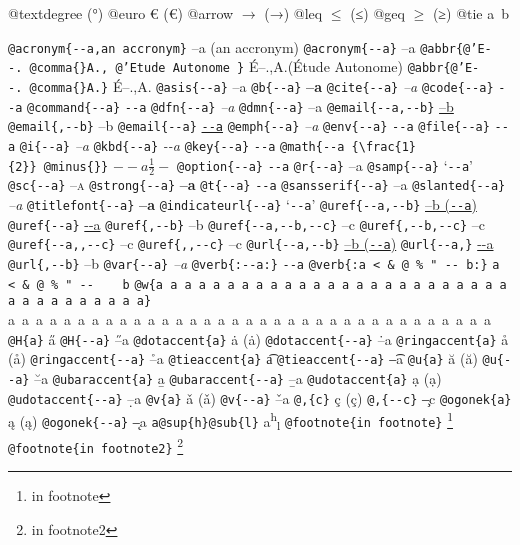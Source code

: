 \documentclass{book}
\newcommand\Texinfocommandstyletextcite[1]{{\normalfont{}\textsl{#1}}}%
\newcommand\Texinfocommandstyletextkbd[1]{{\ttfamily\textsl{#1}}}%
\newcommand\Texinfocommandstyletextvar[1]{{\normalfont{}\textsl{#1}}}%
\renewcommand{\_}{\Texinfounderscore\discretionary{}{}{}}
\begin{document}
\begin{titlepage}
@textdegree \textdegree{} (°)
@euro \euro{} (€)
@arrow $\rightarrow{}$ (→)
@leq $\leq{}$ (≤)
@geq $\geq{}$ (≥)
@tie a~b

\texttt{@acronym\{{-}{-}a,an accronym\}} --a (an accronym)
\texttt{@acronym\{{-}{-}a\}} --a
\texttt{@abbr\{@'E{-}{-}.\ @comma\{\}A.,\ @'Etude Autonome \}} \'{E}--.\@ ,A.\@ (\'{E}tude Autonome)
\texttt{@abbr\{@'E{-}{-}.\ @comma\{\}A.\}} \'{E}--.\@ ,A.\@
\texttt{@asis\{{-}{-}a\}} --a
\texttt{@b\{{-}{-}a\}} \textbf{--a}
\texttt{@cite\{{-}{-}a\}} \Texinfocommandstyletextcite{--a}
\texttt{@code\{{-}{-}a\}} \texttt{{-}{-}a}
\texttt{@command\{{-}{-}a\}} \texttt{{-}{-}a}
\texttt{@dfn\{{-}{-}a\}} \textsl{--a}
\texttt{@dmn\{{-}{-}a\}} \thinspace --a
\texttt{@email\{{-}{-}a,{-}{-}b\}} \href{mailto:--a}{--b}
\texttt{@email\{,{-}{-}b\}} --b
\texttt{@email\{{-}{-}a\}} \href{mailto:--a}{\nolinkurl{--a}}
\texttt{@emph\{{-}{-}a\}} \emph{--a}
\texttt{@env\{{-}{-}a\}} \texttt{{-}{-}a}
\texttt{@file\{{-}{-}a\}} \texttt{{-}{-}a}
\texttt{@i\{{-}{-}a\}} \textit{--a}
\texttt{@kbd\{{-}{-}a\}} \Texinfocommandstyletextkbd{{-}{-}a}
\texttt{@key\{{-}{-}a\}} \texttt{{-}{-}a}
\texttt{@math\{{-}{-}a \{\textbackslash{}frac\{1\}\{2\}\}\ @minus\{\}\}} $--a {\frac{1}{2}} -$
\texttt{@option\{{-}{-}a\}} \texttt{{-}{-}a}
\texttt{@r\{{-}{-}a\}} \textnormal{--a}
\texttt{@samp\{{-}{-}a\}} `\texttt{{-}{-}a}'
\texttt{@sc\{{-}{-}a\}} \textsc{--a}
\texttt{@strong\{{-}{-}a\}} \textbf{--a}
\texttt{@t\{{-}{-}a\}} \texttt{{-}{-}a}
\texttt{@sansserif\{{-}{-}a\}} \textsf{--a}
\texttt{@slanted\{{-}{-}a\}} \textsl{--a}
\texttt{@titlefont\{{-}{-}a\}} {\huge \bfseries --a}
\texttt{@indicateurl\{{-}{-}a\}} `\texttt{{-}{-}a}'
\texttt{@uref\{{-}{-}a,{-}{-}b\}} \href{--a}{--b (\nolinkurl{--a})}
\texttt{@uref\{{-}{-}a\}} \url{--a}
\texttt{@uref\{,{-}{-}b\}} --b
\texttt{@uref\{{-}{-}a,{-}{-}b,{-}{-}c\}} --c
\texttt{@uref\{,{-}{-}b,{-}{-}c\}} --c
\texttt{@uref\{{-}{-}a{,}{,}{-}{-}c\}} --c
\texttt{@uref\{{,}{,}{-}{-}c\}} --c
\texttt{@url\{{-}{-}a,{-}{-}b\}} \href{--a}{--b (\nolinkurl{--a})}
\texttt{@url\{{-}{-}a,\}} \url{--a}
\texttt{@url\{,{-}{-}b\}} --b
\texttt{@var\{{-}{-}a\}} \Texinfocommandstyletextvar{--a}
\texttt{@verb\{:{-}{-}a:\}} \verb:--a:
\texttt{@verb\{:a  < \& @\ \% " {-}{-}    b:\}} \verb:a  < & @ % " --    b:
\texttt{@w\{a a a a a a a a a a a a a a a a a a a a a a a a a a a a a a a a a a a\}} \hbox{a a a a a a a a a a a a a a a a a a a a a a a a a a a a a a a a a a a}
\texttt{@H\{a\}} \H{a}
\texttt{@H\{{-}{-}a\}} \H{--a}
\texttt{@dotaccent\{a\}} \.{a} (ȧ)
\texttt{@dotaccent\{{-}{-}a\}} \.{--a}
\texttt{@ringaccent\{a\}} \r{a} (å)
\texttt{@ringaccent\{{-}{-}a\}} \r{--a}
\texttt{@tieaccent\{a\}} \t{a}
\texttt{@tieaccent\{{-}{-}a\}} \t{--a}
\texttt{@u\{a\}} \u{a} (ă)
\texttt{@u\{{-}{-}a\}} \u{--a}
\texttt{@ubaraccent\{a\}} \b{a}
\texttt{@ubaraccent\{{-}{-}a\}} \b{--a}
\texttt{@udotaccent\{a\}} \d{a} (ạ)
\texttt{@udotaccent\{{-}{-}a\}} \d{--a}
\texttt{@v\{a\}} \v{a} (ǎ)
\texttt{@v\{{-}{-}a\}} \v{--a}
\texttt{@,\{c\}} \c{c} (ç)
\texttt{@,\{{-}{-}c\}} \c{--c}
\texttt{@ogonek\{a\}} \k{a} (ą)
\texttt{@ogonek\{{-}{-}a\}} \k{--a}
\texttt{a@sup\{h\}@sub\{l\}} a\textsuperscript{h}\textsubscript{l}
\texttt{@footnote\{in footnote\}} \footnote{in footnote}
\texttt{@footnote\{in footnote2\}} \footnote{in footnote2}


\end{titlepage}
\end{document}
